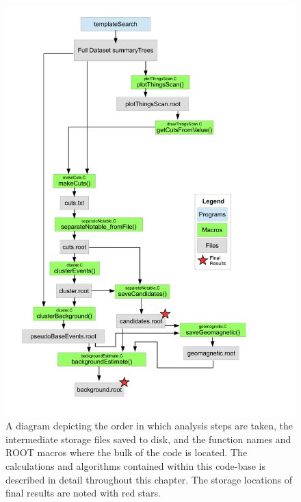\begin{figure}
	\centering
	\includegraphics[height=0.8\textheight]{figures/AnalysisDiagram}
	\caption{A diagram depicting the order in which analysis steps are taken, the intermediate storage files saved to disk, and the function names and ROOT macros where the bulk of the code is located.  The calculations and algorithms contained within this code-base is described in detail throughout this chapter.  The storage locations of final results are noted with red stars.}
	\label{fig:AnalysisDiagram}
\end{figure}	
		
	

